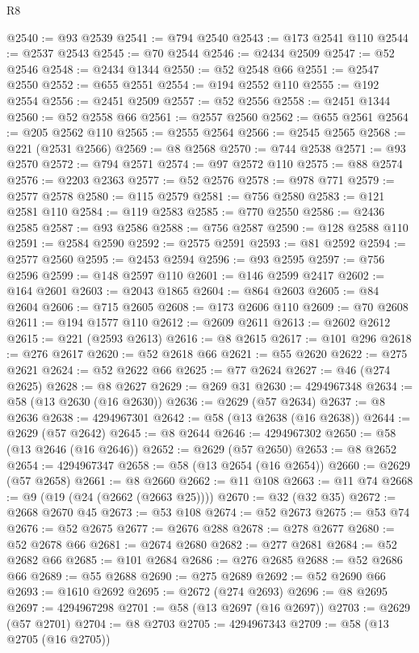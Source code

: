 \begin{lexlean}{R8}
\begin{coremodule}
@2540 := @93 @2539
@2541 := @794 @2540
@2543 := @173 @2541 @110
@2544 := @2537 @2543
@2545 := @70 @2544
@2546 := @2434 @2509
@2547 := @52 @2546
@2548 := @2434 @1344
@2550 := @52 @2548 @66
@2551 := @2547 @2550
@2552 := @655 @2551
@2554 := @194 @2552 @110
@2555 := @192 @2554
@2556 := @2451 @2509
@2557 := @52 @2556
@2558 := @2451 @1344
@2560 := @52 @2558 @66
@2561 := @2557 @2560
@2562 := @655 @2561
@2564 := @205 @2562 @110
@2565 := @2555 @2564
@2566 := @2545 @2565
@2568 := @221 (@2531 @2566)
@2569 := @8 @2568
@2570 := @744 @2538
@2571 := @93 @2570
@2572 := @794 @2571
@2574 := @97 @2572 @110
@2575 := @88 @2574
@2576 := @2203 @2363
@2577 := @52 @2576
@2578 := @978 @771
@2579 := @2577 @2578
@2580 := @115 @2579
@2581 := @756 @2580
@2583 := @121 @2581 @110
@2584 := @119 @2583
@2585 := @770 @2550
@2586 := @2436 @2585
@2587 := @93 @2586
@2588 := @756 @2587
@2590 := @128 @2588 @110
@2591 := @2584 @2590
@2592 := @2575 @2591
@2593 := @81 @2592
@2594 := @2577 @2560
@2595 := @2453 @2594
@2596 := @93 @2595
@2597 := @756 @2596
@2599 := @148 @2597 @110
@2601 := @146 @2599 @2417
@2602 := @164 @2601
@2603 := @2043 @1865
@2604 := @864 @2603
@2605 := @84 @2604
@2606 := @715 @2605
@2608 := @173 @2606 @110
@2609 := @70 @2608
@2611 := @194 @1577 @110
@2612 := @2609 @2611
@2613 := @2602 @2612
@2615 := @221 (@2593 @2613)
@2616 := @8 @2615
@2617 := @101 @296
@2618 := @276 @2617
@2620 := @52 @2618 @66
@2621 := @55 @2620
@2622 := @275 @2621
@2624 := @52 @2622 @66
@2625 := @77 @2624
@2627 := @46 (@274 @2625)
@2628 := @8 @2627
@2629 := @269 @31
@2630 := 4294967348
@2634 := @58 (@13 @2630 (@16 @2630))
@2636 := @2629 (@57 @2634)
@2637 := @8 @2636
@2638 := 4294967301
@2642 := @58 (@13 @2638 (@16 @2638))
@2644 := @2629 (@57 @2642)
@2645 := @8 @2644
@2646 := 4294967302
@2650 := @58 (@13 @2646 (@16 @2646))
@2652 := @2629 (@57 @2650)
@2653 := @8 @2652
@2654 := 4294967347
@2658 := @58 (@13 @2654 (@16 @2654))
@2660 := @2629 (@57 @2658)
@2661 := @8 @2660
@2662 := @11 @108
@2663 := @11 @74
@2668 := @9 (@19 (@24 (@2662 (@2663 @25))))
@2670 := @32 (@32 @35)
@2672 := @2668 @2670 @45
@2673 := @53 @108
@2674 := @52 @2673
@2675 := @53 @74
@2676 := @52 @2675
@2677 := @2676 @288
@2678 := @278 @2677
@2680 := @52 @2678 @66
@2681 := @2674 @2680
@2682 := @277 @2681
@2684 := @52 @2682 @66
@2685 := @101 @2684
@2686 := @276 @2685
@2688 := @52 @2686 @66
@2689 := @55 @2688
@2690 := @275 @2689
@2692 := @52 @2690 @66
@2693 := @1610 @2692
@2695 := @2672 (@274 @2693)
@2696 := @8 @2695
@2697 := 4294967298
@2701 := @58 (@13 @2697 (@16 @2697))
@2703 := @2629 (@57 @2701)
@2704 := @8 @2703
@2705 := 4294967343
@2709 := @58 (@13 @2705 (@16 @2705))

\end{coremodule}
\end{lexlean}
